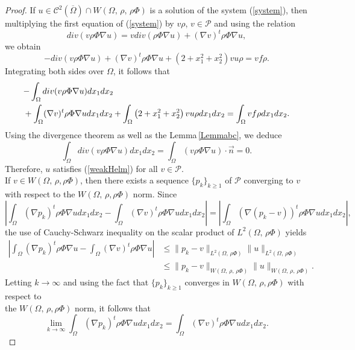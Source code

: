 \documentclass[11pt]{article}
\begin{document}
		\begin{proof}
			If $u\in \mathcal{C}^2(\overline{\Omega})\cap W(\Omega,\,\rho,\,\rho\Phi)$ is a solution of the system (\ref{system}), then multiplying the first equation of (\ref{system}) by $v\rho $,  $v\in\mathcal{P}$ and using the relation
			$$div(v\rho \Phi\nabla u)=vdiv(\rho \Phi\nabla u)+(\nabla v)^t\rho \Phi\nabla u,$$ we obtain 
			\begin{equation}\label{Helm2}
				-div(v\rho \Phi\nabla u)+(\nabla v)^t\rho \Phi\nabla u+\left(2+{x_1^2+x_2^2}\right)vu\rho = vf\rho .
			\end{equation}
			Integrating both sides over $\Omega$, it follows that		
			\begin{align*}
				\lefteqn{-\int_{\Omega}div(v\rho \Phi\nabla u)dx_1dx_2}&\\
				&+\int_{\Omega}(\nabla v)^t\rho \Phi\nabla udx_1dx_2+\int_{\Omega}\left(2+{x_1^2+x_2^2}\right)vu\rho dx_1dx_2=\int_{\Omega}vf\rho dx_1dx_2.
			\end{align*}
			Using the divergence theorem as well as  the Lemma\,\ref{Lemmabc}, we deduce $$\int_{\Omega}div(v\rho \Phi\nabla u)dx_1dx_2=\int_{{\Omega}}\left(v\rho\Phi\nabla u\right)\cdot\overrightarrow{n}=0.$$ Therefore, $u$ satisfies (\ref{weakHelm}) for all $v\in\mathcal{P}$.\\ 
			If $v\in W(\Omega,\,\rho ,\rho\Phi)$, then there exists a sequence $\{p_k\}_{k\geq 1}$ of $\mathcal{P}$ converging to $v$ with respect to the $W(\Omega,\,\rho ,\rho\Phi)$ norm. 
			Since 
			\begin{equation*}
				\left\lvert\int_{\Omega}(\nabla p_k)^t\rho \Phi\nabla u dx_1dx_2-\int_{\Omega}(\nabla v)^t\rho \Phi\nabla u dx_1dx_2 \right\rvert=\left\lvert\int_{\Omega}(\nabla (p_k-v))^t\rho \Phi\nabla u dx_1dx_2\right\rvert,
			\end{equation*}
			the use of Cauchy-Schwarz inequality on the scalar product of $L^2(\Omega,\,\rho \Phi)$ yields 
			\begin{align*}
				\left	\lvert\int_{\Omega}(\nabla p_k)^t\rho \Phi\nabla u-\int_{\Omega}(\nabla v)^t\rho \Phi\nabla u \right\rvert&\leq\|p_k-v\|_{L^{2}\left(\Omega,\,\rho \Phi\right)}\|u\|_{L^{2}\left(\Omega, \,\rho \Phi\right)}\\
				&\leq \|p_k-v\|_{W\left(\Omega,\, \rho ,\,\rho \Phi\right)}\|u\|_{W\left(\Omega,\, \rho ,\,\rho \Phi\right)}.
			\end{align*}
			Letting $k\to\infty$ and using the fact that $\{p_k\}_{k\geq 1}$  converges in $W(\Omega,\,\rho ,\rho\Phi)$ with respect to\\ the $W(\Omega,\,\rho ,\rho\Phi)$ norm, it follows that 
			\begin{equation*}
				\lim_{k \to \infty }\int_{\Omega}(\nabla p_k)^t\rho \Phi\nabla u dx_1dx_2=\int_{\Omega}(\nabla v)^t\rho \Phi\nabla u dx_1dx_2.
			\end{equation*}
			 

\end{proof}
\end{document}
